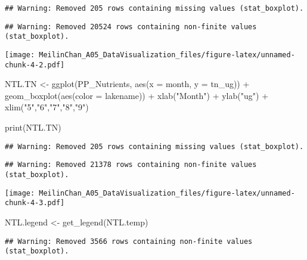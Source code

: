 \documentclass[
]{article}
\newenvironment{Shaded}{\begin{snugshade}}{\end{snugshade}}
\newcommand{\AttributeTok}[1]{\textcolor[rgb]{0.77,0.63,0.00}{#1}}
\newcommand{\FunctionTok}[1]{\textcolor[rgb]{0.00,0.00,0.00}{#1}}
\newcommand{\NormalTok}[1]{#1}
\newcommand{\OtherTok}[1]{\textcolor[rgb]{0.56,0.35,0.01}{#1}}
\newcommand{\SpecialCharTok}[1]{\textcolor[rgb]{0.00,0.00,0.00}{#1}}
\newcommand{\StringTok}[1]{\textcolor[rgb]{0.31,0.60,0.02}{#1}}
\begin{document}
\begin{verbatim}
## Warning: Removed 205 rows containing missing values (stat_boxplot).
\end{verbatim}

\begin{verbatim}
## Warning: Removed 20524 rows containing non-finite values (stat_boxplot).
\end{verbatim}

\texttt{[image: MeilinChan\_A05\_DataVisualization\_files/figure-latex/unnamed-chunk-4-2.pdf]}

\begin{Shaded}
\begin{Highlighting}[]
\NormalTok{NTL.TN }\OtherTok{\textless{}{-}} \FunctionTok{ggplot}\NormalTok{(PP\_Nutrients, }\FunctionTok{aes}\NormalTok{(}\AttributeTok{x =}\NormalTok{ month, }\AttributeTok{y =}\NormalTok{ tn\_ug)) }\SpecialCharTok{+}
  \FunctionTok{geom\_boxplot}\NormalTok{(}\FunctionTok{aes}\NormalTok{(}\AttributeTok{color =}\NormalTok{ lakename)) }\SpecialCharTok{+}
  \FunctionTok{xlab}\NormalTok{(}\StringTok{"Month"}\NormalTok{) }\SpecialCharTok{+}
  \FunctionTok{ylab}\NormalTok{(}\StringTok{"ug"}\NormalTok{) }\SpecialCharTok{+}
  \FunctionTok{xlim}\NormalTok{(}\StringTok{"5"}\NormalTok{,}\StringTok{"6"}\NormalTok{,}\StringTok{"7"}\NormalTok{,}\StringTok{"8"}\NormalTok{,}\StringTok{"9"}\NormalTok{)}

\FunctionTok{print}\NormalTok{(NTL.TN)}
\end{Highlighting}
\end{Shaded}

\begin{verbatim}
## Warning: Removed 205 rows containing missing values (stat_boxplot).
\end{verbatim}

\begin{verbatim}
## Warning: Removed 21378 rows containing non-finite values (stat_boxplot).
\end{verbatim}

\texttt{[image: MeilinChan\_A05\_DataVisualization\_files/figure-latex/unnamed-chunk-4-3.pdf]}

\begin{Shaded}
\begin{Highlighting}[]
\NormalTok{NTL.legend }\OtherTok{\textless{}{-}} \FunctionTok{get\_legend}\NormalTok{(NTL.temp)}
\end{Highlighting}
\end{Shaded}

\begin{verbatim}
## Warning: Removed 3566 rows containing non-finite values (stat_boxplot).
\end{verbatim}
\end{document}

